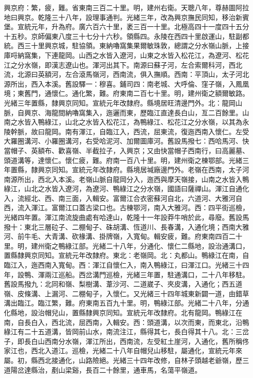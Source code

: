 \begin{pinyinscope}
興京府：繁，疲，難。省東南三百二十里。明，建州右衛。天聰八年，尊赫圖阿拉地曰興京。乾隆三十八年，設理事通判。光緒三年，改為興京撫民同知，移治新賓堡。宣統元年，升為府。廣六百六十里，袤三百一十里。北極高四十一度四十五分十五秒。京師偏東八度三十七分十六秒。領縣四。永陵在西四十里啟運山，駐副都統。西三十里興京城，駐協領。東納嚕窩集果爾敏珠敦，總謂之分水嶺山脈，上接庫哷納窩集，下連龍岡。山西之水皆入遼河，山東之水皆入松花江，為遼河、松花江之分水嶺，即漢志遼山也。渾河出其下。南源曰蘇子河，左合索爾科河，西北流，北源曰英額河，左合滾馬嶺河，西南流，俱入撫順。西南：平頂山，太子河北源所出，西入本溪。舊設驛一：穆喜。鋪司四：南老城、大呼倫、窪子嶺，入鳳凰境；東舊門，通懷仁。通化繁，難。府東南二百七十里。明，建州衛之額爾敏路。光緒三年置縣，隸興京同知。宣統元年改隸府。縣境居旺清邊門外。北：龍岡山脈，自興京、海龍間納嚕窩集入，迤邐而東，歷臨江直達長白山，亙二百餘里。山南之水皆入鴨綠江，山北之水皆入松花江，為鴨綠江、松花江之分水嶺，以其為永陵幹脈，故曰龍岡。南有渾江，自臨江入，西流，屈東流，復迤西南入懷仁。左受大羅圈溝河、小羅圈溝河，右受哈泥河、加爾圖庫河。舊設馬撥七：西哈馬河、快當帽子、英額布、歡喜嶺、半截拉子，入興京；又由快當帽子西南行，曰高麗墓、頭道溝等，達懷仁。懷仁疲，難。府南一百八十里。明，建州衛之棟鄂部。光緒三年置縣，隸興京同知。宣統元年改隸府。縣境居堿廠邊門外。老嶺在西南，太子河南源所出，西北入本溪。老嶺山脈自龍岡分入，迤西與摩天嶺接，山南之水皆入鴨綠江，山北之水皆入遼河，為遼河、鴨綠江之分水嶺，國語曰薩禪山。渾江自通化入，流經北、西、南三面，入輯安。富爾江合衣密蘇河自北，六道河、大雅河自西，流入渾江。富爾江口蓋古梁口也。古棟鄂河，南入大雅河。西：四平街巡檢，光緒四年置。渾江南流旋曲處有哈達山，乾隆十一年設莽牛哨於此，尋廢。舊設馬撥十：東北三層砬子、二棚甸子、硃胡溝、恆道川、長春溝，入通化境；西南大雅河、前牛毛、大青溝、砍椽溝、掛牌嶺，入寬甸。輯安疲，難。府東南四百二十里。明，建州衛之鴨綠江部。光緒二十八年，分通化、懷仁二縣地，設治通溝口，置縣隸興京同知。宣統元年改隸府。東北：老嶺岡。北：丸都山。鴨綠江在南，自臨江入，迤西南入寬甸。西：渾江自懷仁入，南入鴨綠江，曰渾江口。光緒三十四年，設鴨、渾兩江巡船。西岔溝門巡檢，光緒三年置，駐通溝口，二十八年移駐。舊設馬撥九：北同和嶺、梨樹溝、葦沙河、二道崴子、夾皮溝，入通化；西五道嶺、皮條溝、上漏河、二棚甸子，入懷仁。又光緒三十四年城東新闢一道，由錯草溝出臨江。臨江繁，難。府東南五百九十里。明，鴨綠江部。光緒二十八年，分通化縣地，設治帽兒山，置縣隸興京同知。宣統元年改隸府。北有龍岡。鴨綠江在南，自長白入，西北流，屈西南，入輯安。西：頭道溝，以次而東，而東北，沿鴨綠江有二十五道溝，皆岡前山水，南流注江，縣得其七，長白得其十八。北：三岔子，即長白山西南分水嶺，渾江所出，西南流，左受紅土崖河，入通化，舊所稱佟家江也，西北入道江。巡檢，光緒二十八年自帽兒山移駐，屬通化，宣統元年來屬。初，縣西北接通化，山路險絕。光緒三十四年改修，自林子頭越老爺嶺，歷三道陽岔達縣治，剷山梁谿，長百二十餘里，通車馬，名蕩平嶺道。


\end{pinyinscope}
